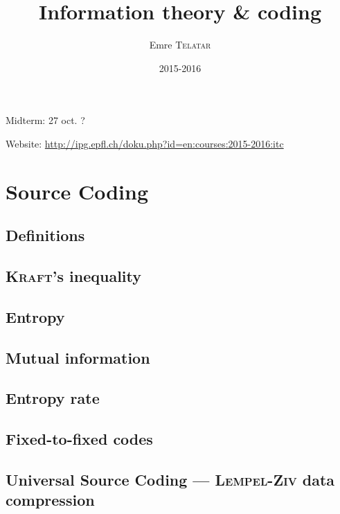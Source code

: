 

\title{Information theory \& coding}
\author{Emre \textsc{Telatar}}
\date{2015-2016}


\maketitle
\tableofcontents

\newpage

Midterm: 27 oct. ?

Website: \url{http://ipg.epfl.ch/doku.php?id=en:courses:2015-2016:itc}

\chapter{Source Coding}
    \section{Definitions}
        
    \section{\textsc{Kraft}'s inequality}
        
    \section{Entropy}
        
    \section{Mutual information}
        
    \section{Entropy rate}
        
    \section{Fixed-to-fixed codes}
        
    \section[Universal Source Coding]{Universal Source Coding \---- \textsc{Lempel}-\textsc{Ziv} data compression}
        



\nocite{*}







